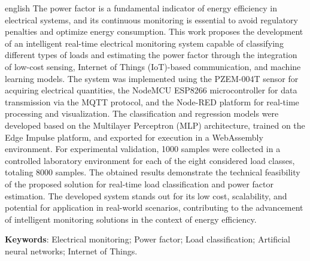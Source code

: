 \begin{resumo}[Abstract]
 \begin{otherlanguage*}{english}
   The power factor is a fundamental indicator of energy efficiency in electrical systems, and its continuous monitoring is essential to avoid regulatory penalties and optimize energy consumption. This work proposes the development of an intelligent real-time electrical monitoring system capable of classifying different types of loads and estimating the power factor through the integration of low-cost sensing, Internet of Things (IoT)-based communication, and machine learning models. The system was implemented using the PZEM-004T sensor for acquiring electrical quantities, the NodeMCU ESP8266 microcontroller for data transmission via the MQTT protocol, and the Node-RED platform for real-time processing and visualization. The classification and regression models were developed based on the Multilayer Perceptron (MLP) architecture, trained on the Edge Impulse platform, and exported for execution in a WebAssembly environment. For experimental validation, 1000 samples were collected in a controlled laboratory environment for each of the eight considered load classes, totaling 8000 samples. The obtained results demonstrate the technical feasibility of the proposed solution for real-time load classification and power factor estimation. The developed system stands out for its low cost, scalability, and potential for application in real-world scenarios, contributing to the advancement of intelligent monitoring solutions in the context of energy efficiency.

   \textbf{Keywords}: Electrical monitoring; Power factor; Load classification; Artificial neural networks; Internet of Things.
 \end{otherlanguage*}
\end{resumo}